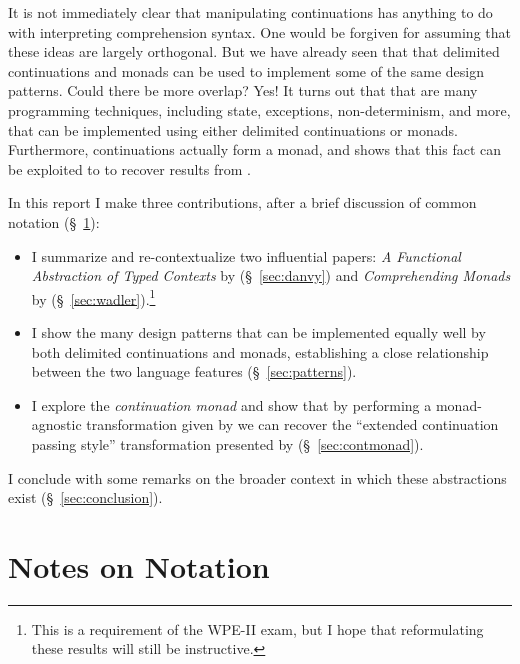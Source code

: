 \documentclass[acmsmall, nonacm, screen]{acmart}
\newif\ifdraft\draftfalse
\newcommand{\outline}[1]{
  \ifdraft
  {\color{gray}{#1}}
  \fi
}
\begin{document}
It is not immediately clear that manipulating continuations has anything to do with interpreting
comprehension syntax. One would be forgiven for assuming that these ideas are largely orthogonal.
But we have already seen that that delimited continuations and monads can be used to implement
some of the same design patterns. Could there be more overlap? Yes! It turns out that that are
many programming techniques, including state, exceptions, non-determinism, and more, that can be
implemented using either delimited continuations or monads. Furthermore, continuations actually
form a monad, and \citeauthor{wadler1990comprehending} shows that this fact can be exploited to
to recover results from \citeauthor{danvy1989functional}.

In this report I make three contributions, after a brief discussion of common notation
(\S~\ref{sec:notation}):
\begin{itemize}
  \item I summarize and re-contextualize two influential papers: {\em A Functional Abstraction of
  Typed Contexts} by \citeauthor{danvy1989functional} (\S~\ref{sec:danvy}) and {\em Comprehending
  Monads} by \citeauthor{wadler1990comprehending} (\S~\ref{sec:wadler}).\footnote{This is a
  requirement of the WPE-II exam, but I hope that reformulating these results will still be
  instructive.}
  \item I show the many design patterns that can be implemented equally well by both delimited
  continuations and monads, establishing a close relationship between the two language features
  (\S~\ref{sec:patterns}).
  \item I explore the {\em continuation monad} and show that by performing a monad-agnostic
  transformation given by \citeauthor{wadler1990comprehending} we can recover the ``extended
  continuation passing style'' transformation presented by \citeauthor{danvy1989functional}
  (\S~\ref{sec:contmonad}).
\end{itemize}
I conclude with some remarks on the broader context in which these abstractions exist
(\S~\ref{sec:conclusion}).

\section{Notes on Notation} \label{sec:notation}

\outline{
\begin{itemize}
  \item Racket and Haskell for examples
  \item Delimited Continuations: {\tt shift k in e} vs $\xi k.\,e$, {\tt reset e} vs $\langle e \rangle$
  \item Monads: join vs. bind vs. comprehensions.
    $x \leftarrow e_1 ;\!; e_2 \equiv \textsf{bind}~e_1~(\lambda x.\, e_2)$
  \item Assume a base, simply-typed lambda calculus
\end{itemize}
}
\end{document}
